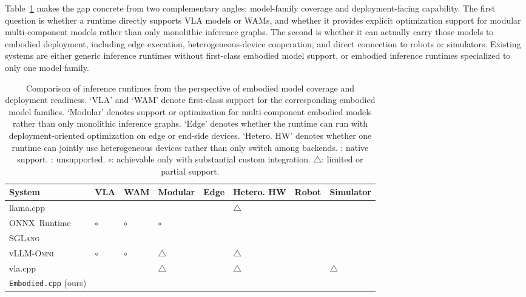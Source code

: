 \documentclass[11pt,letterpaper,logo]{seu-paisys}
\newcommand{\system}{\texttt{Embodied.cpp}\xspace}
\newcommand{\llamacpp}{llama.cpp}
\newcommand{\vlacpp}{vla.cpp}
\newcommand{\cmark}{\ding{51}}
\newcommand{\xmark}{\ding{55}}
\newcommand{\omark}{\ensuremath{\circ}}
\newcommand{\tmark}{\ensuremath{\triangle}}
\begin{document}
Table~\ref{tab:runtime-compare} makes the gap concrete from two complementary angles: model-family coverage and deployment-facing capability. The first question is whether a runtime directly supports VLA models or WAMs, and whether it provides explicit optimization support for modular multi-component models rather than only monolithic inference graphs. The second is whether it can actually carry those models to embodied deployment, including edge execution, heterogeneous-device cooperation, and direct connection to robots or simulators. Existing systems are either generic inference runtimes without first-class embodied model support, or embodied inference runtimes specialized to only one model family.

\begin{table}[t]
\centering
\caption{Comparison of inference runtimes from the perspective of embodied model coverage and deployment readiness. `VLA' and `WAM' denote first-class support for the corresponding embodied model families. `Modular' denotes support or optimization for multi-component embodied models rather than only monolithic inference graphs. `Edge' denotes whether the runtime can run with deployment-oriented optimization on edge or end-side devices. `Hetero. HW' denotes whether one runtime can jointly use heterogeneous devices rather than only switch among backends. \cmark: native support. \xmark: unsupported. \omark: achievable only with substantial custom integration. \tmark: limited or partial support.}
\label{tab:runtime-compare}
\footnotesize
\setlength{\tabcolsep}{4.1pt}
\renewcommand{\arraystretch}{1.14}
\begin{tabularx}{\textwidth}{>{\raggedright\arraybackslash}X >{\centering\arraybackslash}p{} >{\centering\arraybackslash}p{} >{\centering\arraybackslash}p{} >{\centering\arraybackslash}p{} >{\centering\arraybackslash}p{} >{\centering\arraybackslash}p{} >{\centering\arraybackslash}p{}}
\toprule
\rowcolor{black!5}
\textbf{System} & \textbf{VLA} & \textbf{WAM} & \textbf{Modular} & \textbf{Edge} & \textbf{Hetero. HW} & \textbf{Robot} & \textbf{Simulator} \\
\midrule
\llamacpp{}~\cite{llama-cpp} & \xmark & \xmark & \xmark & \cmark & \tmark & \xmark & \xmark \\
\mbox{ONNX Runtime}~\cite{onnxruntime} & \omark & \omark & \omark & \cmark & \cmark & \xmark & \xmark \\
\textsc{SGLang}~\cite{sglang} & \xmark & \xmark & \xmark & \xmark & \xmark & \xmark & \xmark \\
\textsc{vLLM-Omni}~\cite{vllm-omni} & \omark & \omark & \tmark & \xmark & \tmark & \xmark & \xmark \\
\vlacpp{}~\cite{vla-cpp} & \cmark & \xmark & \tmark & \cmark & \tmark & \cmark & \tmark \\
\system{} (ours) & \cmark & \cmark & \cmark & \cmark & \cmark & \cmark & \cmark \\
\bottomrule
\end{tabularx}
\end{table}
\end{document}

